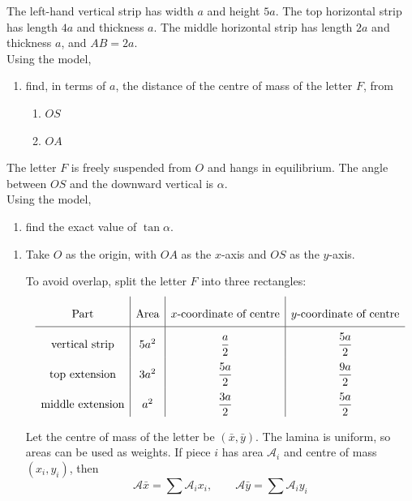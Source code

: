 \documentclass[leqno]{article}
\begin{document}
\begin{enumerate}[
  label=\textbf{\arabic*.},
  leftmargin=*,
  topsep=0pt,
  partopsep=0pt,
  parsep=0pt
]
The left-hand vertical strip has width $a$ and height $5a$. The top horizontal strip has length $4a$ and thickness $a$. The middle horizontal strip has length $2a$ and thickness $a$, and $AB=2a$. \\

Using the model, \\
\begin{enumerate}[label=\textbf{(\alph*)}]
  \item find, in terms of $a$, the distance of the centre of mass of the letter $F$, from
  \begin{enumerate}[label=(\roman*)]
    \item $OS$
    \item $OA$
  \end{enumerate}
\end{enumerate}
The letter $F$ is freely suspended from $O$ and hangs in equilibrium. The angle between $OS$ and the downward vertical is $\alpha$. \\

Using the model, \\
\begin{enumerate}[label=\textbf{(\alph*)}, resume]
  \item find the exact value of $\tan\alpha$.  \\
\end{enumerate}

\vspace*{10pt}

\begin{djsSolution}
\begin{enumerate}[label=\textbf{(\alph*)}, start=1]
  \item Take \(O\) as the origin, with \(OA\) as the \(x\)-axis and \(OS\) as the \(y\)-axis.

  To avoid overlap, split the letter \(F\) into three rectangles:
\[
\begingroup
\renewcommand{\arraystretch}{2.2}
\begin{array}{c|c|c|c}
\text{Part} & \text{Area} & x\text{-coordinate of centre} & y\text{-coordinate of centre} \\
\hline
\text{vertical strip} & 5a^2 & \dfrac{a}{2} & \dfrac{5a}{2} \\
\text{top extension} & 3a^2 & \dfrac{5a}{2} & \dfrac{9a}{2} \\
\text{middle extension} & a^2 & \dfrac{3a}{2} & \dfrac{5a}{2}
\end{array}
\endgroup
\]

  Let the centre of mass of the letter be \((\bar x,\bar y)\). The lamina is uniform, so areas can be used as weights. If piece \(i\) has area \(\mathcal{A}_i\) and centre of mass \((x_i,y_i)\), then
  \[
  \mathcal{A}\bar x=\sum\mathcal{A}_ix_i,\qquad\mathcal{A}\bar y=\sum\mathcal{A}_iy_i
  \]


\end{enumerate}
\end{djsSolution}
\end{enumerate}
\end{document}
